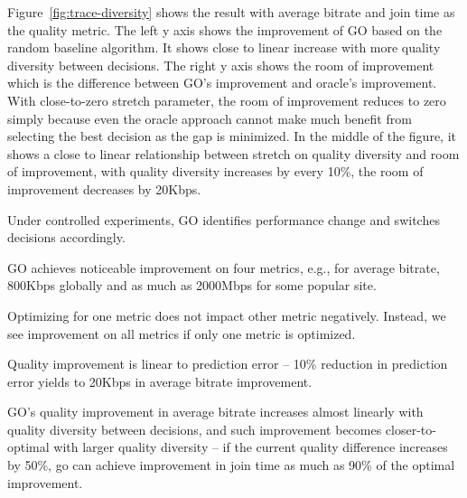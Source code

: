 Figure~\ref{fig:trace-diversity} shows the result with average bitrate and join time as the quality metric. The left y axis shows the improvement of GO based on the random baseline algorithm. It shows close to linear increase with more quality diversity between decisions. 
The right y axis shows the room of improvement which is the difference between GO's improvement and oracle's improvement. With close-to-zero stretch parameter, the room of improvement reduces to zero simply because even the oracle approach cannot make much benefit from selecting the best decision as the gap is minimized. 
In the middle of the figure, it shows a close to linear relationship between stretch on quality diversity and room of improvement, with quality diversity increases by every 10\%, the room of improvement decreases by 20Kbps. 



\begin{packedenumerate}
	\item Under controlled experiments, GO identifies performance change and switches decisions accordingly.
	\item GO achieves noticeable improvement on four metrics, e.g., for  average bitrate, 800Kbps globally and as much as 2000Mbps for some popular site.
	\item Optimizing for one metric does not impact other metric negatively. Instead, we see improvement on all metrics if only one metric is optimized.
	\item Quality improvement is linear to prediction error -- 10\% reduction in prediction error yields to 20Kbps in average bitrate improvement.
	\item GO's quality improvement in average bitrate increases almost linearly with quality diversity between decisions, and such improvement becomes closer-to-optimal with larger quality diversity -- if the current quality difference increases by 50\%, go can achieve improvement in join time as much as 90\% of the optimal improvement.
\end{packedenumerate}






































